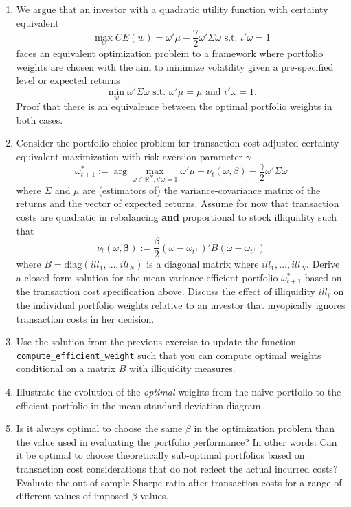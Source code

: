 \documentclass[
]{book}
\providecommand{\tightlist}{%
  \setlength{\itemsep}{0pt}\setlength{\parskip}{0pt}}
\begin{document}
\begin{enumerate}
\def\labelenumi{\arabic{enumi}.}
\tightlist
\item
  We argue that an investor with a quadratic utility function with certainty equivalent \[\max_w CE(w) = \omega'\mu - \frac{\gamma}{2} \omega'\Sigma \omega \text{ s.t. } \iota'\omega = 1\]
  faces an equivalent optimization problem to a framework where portfolio weights are chosen with the aim to minimize volatility given a pre-specified level or expected returns
  \[\min_w \omega'\Sigma \omega \text{ s.t. } \omega'\mu = \bar\mu \text{ and } \iota'\omega = 1. \] Proof that there is an equivalence between the optimal portfolio weights in both cases.
\item
  Consider the portfolio choice problem for transaction-cost adjusted certainty equivalent maximization with risk aversion parameter \(\gamma\)
  \[\omega_{t+1} ^* :=  \arg\max_{\omega \in \mathbb{R}^N,  \iota'\omega = 1} \omega'\mu - \nu_t (\omega, \beta) - \frac{\gamma}{2}\omega'\Sigma\omega\]
  where \(\Sigma\) and \(\mu\) are (estimators of) the variance-covariance matrix of the returns and the vector of expected returns. Assume for now that transaction costs are quadratic in rebalancing \textbf{and} proportional to stock illiquidity such that
  \[\nu_t\left(\omega, \mathbf{\beta}\right) := \frac{\beta}{2} \left(\omega - \omega_{t^+}\right)'B\left(\omega - \omega_{t^+}\right)\] where \(B = \text{diag}(ill_1, \ldots, ill_N)\) is a diagonal matrix where \(ill_1, \ldots, ill_N\). Derive a closed-form solution for the mean-variance efficient portfolio \(\omega_{t+1} ^*\) based on the transaction cost specification above. Discuss the effect of illiquidity \(ill_i\) on the individual portfolio weights relative to an investor that myopically ignores transaction costs in her decision.
\item
  Use the solution from the previous exercise to update the function \texttt{compute\_efficient\_weight} such that you can compute optimal weights conditional on a matrix \(B\) with illiquidity measures.
\item
  Illustrate the evolution of the \emph{optimal} weights from the naive portfolio to the efficient portfolio in the mean-standard deviation diagram.
\item
  Is it always optimal to choose the same \(\beta\) in the optimization problem than the value used in evaluating the portfolio performance? In other words: Can it be optimal to choose theoretically sub-optimal portfolios based on transaction cost considerations that do not reflect the actual incurred costs? Evaluate the out-of-sample Sharpe ratio after transaction costs for a range of different values of imposed \(\beta\) values.
\end{enumerate}
\end{document}
